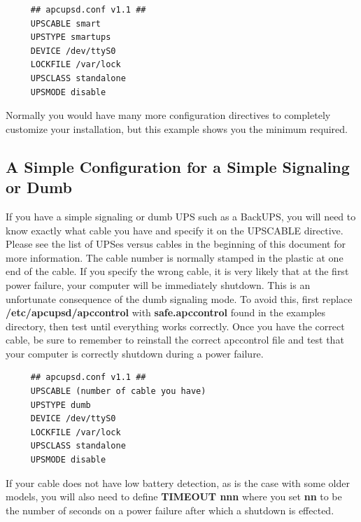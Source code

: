 \footnotesize
\begin{verbatim}
     ## apcupsd.conf v1.1 ##
     UPSCABLE smart
     UPSTYPE smartups
     DEVICE /dev/ttyS0
     LOCKFILE /var/lock
     UPSCLASS standalone
     UPSMODE disable
\end{verbatim}
\normalsize

Normally you would have many more configuration directives to completely
customize your installation, but this example shows you the minimum required. 

\label{A-Simple-Configuration-for-a-Simple-Signaling-or-Dumb}

\subsection*{A Simple Configuration for a Simple Signaling or Dumb}

\label{index-Configuration_002c-dumb-71}
\label{index-dumb_002c-configuration-72}
\label{index-Example_002c-dumb-conf-73}
If you have a simple signaling or dumb UPS such as a BackUPS, you will need to
know exactly what cable you have and specify it on the UPSCABLE directive.
Please see the list of UPSes versus cables in the beginning of this document
for more information. The cable number is normally stamped in the plastic at
one end of the cable. If you specify the wrong cable, it is very likely that
at the first power failure, your computer will be immediately shutdown. This
is an unfortunate consequence of the dumb signaling mode.  To avoid this,
first replace {\bf /etc/apcupsd/apccontrol} with {\bf safe.apccontrol} found
in the examples directory, then test until everything works correctly. Once
you have the correct cable, be sure to remember to reinstall the correct
apccontrol file and test that your computer is correctly shutdown during a
power failure. 

\footnotesize
\begin{verbatim}
     ## apcupsd.conf v1.1 ##
     UPSCABLE (number of cable you have)
     UPSTYPE dumb
     DEVICE /dev/ttyS0
     LOCKFILE /var/lock
     UPSCLASS standalone
     UPSMODE disable
\end{verbatim}
\normalsize

If your cable does not have low battery detection, as is the case with some
older models, you will also need to define {\bf TIMEOUT nnn} where you set
{\bf nn} to be the number of seconds on a power failure after which a shutdown
is effected.  

